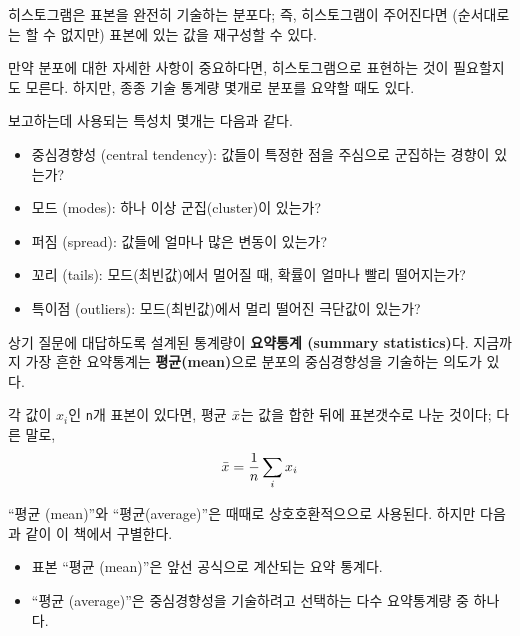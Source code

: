 히스토그램은 표본을 완전히 기술하는 분포다; 즉, 히스토그램이 주어진다면 (순서대로는 할 수 없지만) 표본에 있는 값을 재구성할 수 있다.

만약 분포에 대한 자세한 사항이 중요하다면, 히스토그램으로 표현하는 것이 필요할지도 모른다.
하지만, 종종 기술 통계량 몇개로 분포를 요약할 때도 있다.

보고하는데 사용되는 특성치 몇개는 다음과 같다.

\begin{itemize}

\item 중심경향성 (central tendency): 
값들이 특정한 점을 주심으로 군집하는 경향이 있는가?

\item 모드 (modes): 하나 이상 군집(cluster)이 있는가?

\item 퍼짐 (spread): 값들에 얼마나 많은 변동이 있는가?

\item 꼬리 (tails): 모드(최빈값)에서 멀어질 때, 확률이 얼마나 빨리 떨어지는가?

\item 특이점 (outliers): 모드(최빈값)에서 멀리 떨어진 극단값이 있는가?

\end{itemize}

상기 질문에 대답하도록 설계된 통계량이 {\bf 요약통계 (summary statistics)}다.
지금까지 가장 흔한 요약통계는  {\bf 평균(mean)}으로 분포의 중심경향성을 기술하는 의도가 있다.

각 값이 $x_i$인 {\tt n}개 표본이 있다면, 평균 $\bar{x}$는 값을 합한 뒤에 표본갯수로 나눈 것이다;
다른 말로, 
%
\[ \bar{x} = \frac{1}{n} \sum_i x_i \]
%

``평균 (mean)''와 ``평균(average)''은 때때로 상호호환적으으로 사용된다. 하지만 다음과 같이 이 책에서 구별한다.


\begin{itemize}

\item 표본 ``평균 (mean)''은 앞선 공식으로 계산되는 요약 통계다.

\item ``평균 (average)''은 중심경향성을 기술하려고 선택하는 다수 요약통계량 중 하나다.

\end{itemize}

